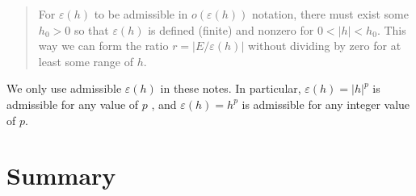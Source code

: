 \begin{quote}
For $\varepsilon(h)$ to be admissible in $o(\varepsilon(h))$ notation, there must exist some  $h_0 > 0$ so that $\varepsilon(h)$ is defined (finite) and nonzero for  $0 < |h| < h_0$.  This way we can form the ratio $r=|E/\varepsilon(h)|$ without dividing by zero for at least some range of $h$.
\end{quote}
 
We only use admissible $\varepsilon(h)$ in these notes.  In particular, $\varepsilon(h) = {|h|}^p$  is admissible for any value of  $p$ , and $\varepsilon(h) = h^p$ is admissible for any integer value of $p$.  

\section{Summary}
